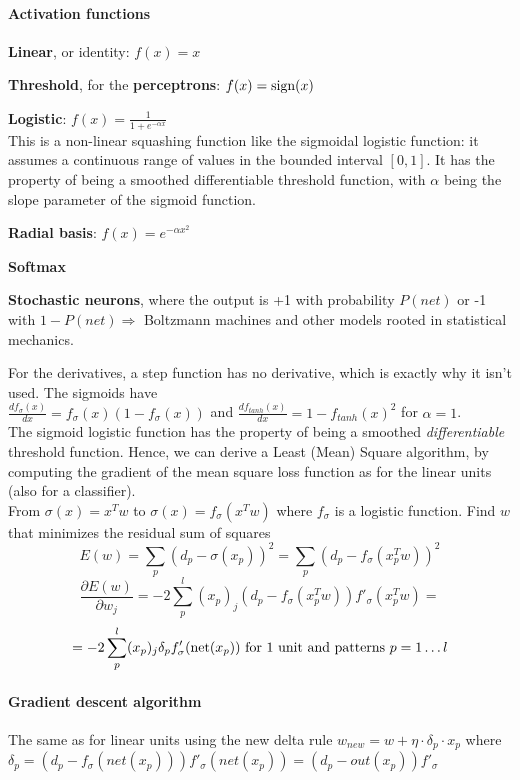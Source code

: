 \documentclass[10pt]{report}
\begin{document}
\paragraph{Activation functions}
\begin{list}{}{}
	\item \textbf{Linear}, or identity: $f(x) = x$
	\item \textbf{Threshold}, for the \textbf{perceptrons}: $f(x) = \hbox{sign}(x)$
	\item \textbf{Logistic}: $f(x) = \frac{1}{1 + e^{-\alpha x}}$\\
	This is a non-linear squashing function like the sigmoidal logistic function: it assumes a continuous range of values in the bounded interval $[0,1]$. It has the property of being a smoothed differentiable threshold function, with $\alpha$ being the slope parameter of the sigmoid function.
	\item \textbf{Radial basis}: $f(x) = e^{-\alpha x^2}$
	\item \textbf{Softmax}
	\item \textbf{Stochastic neurons}, where the output is +1 with probability $P(net)$ or -1 with $1-P(net) \Rightarrow$ Boltzmann machines and other models rooted in statistical mechanics.
\end{list}
For the derivatives, a step function has no derivative, which is exactly why it isn't used. The sigmoids have\\$\frac{df_\sigma(x)}{dx} = f_\sigma(x) (1-f_\sigma(x))$ and $\frac{df_{tanh}(x)}{dx} = 1 - f_{tanh}(x)^2$ for $\alpha = 1$.\\
The sigmoid logistic function has the property of being a smoothed \textit{differentiable} threshold function. Hence, we can derive a Least (Mean) Square algorithm, by computing the gradient of the mean square loss function as for the linear units (also for a classifier).\\
From $\sigma(x) = x^Tw$ to $\sigma(x) = f_\sigma(x^Tw)$ where $f_\sigma$ is a logistic function. Find $w$ that minimizes the residual sum of squares $$E(w) = \sum_p (d_p - \sigma(x_p))^2 = \sum_p (d_p - f_\sigma(x_p^Tw))^2$$
$$\frac{\partial E(w)}{\partial w_j} = -2\sum_p^l (x_p)_j (d_p - f_\sigma(x_p^Tw))f'_\sigma(x_p^Tw) =$$ $$= -2\sum_p^l(x_p)_j\delta_pf'_\sigma(\hbox{net}(x_p))\text{ for 1 unit and patterns }p = 1\ldots l$$
\paragraph{Gradient descent algorithm} 
The same as for linear units using the new delta rule $w_{new} = w + \eta\cdot\delta_p\cdot x_p$ where $\delta_p = (d_p - f_\sigma(net(x_p)))f'_\sigma(net(x_p)) = (d_p-out(x_p))f'_\sigma$
\end{document}
